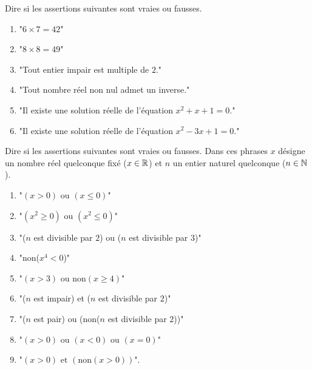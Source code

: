 \documentclass[11pt,class=report,crop=false]{standalone}
\begin{document}


\bigskip
\bigskip


\exercice{}
\enonce
Dire si les assertions suivantes sont vraies ou fausses.
 \begin{enumerate}
      \item "$6\times 7 = 42$"
      \item "$8 \times 8 = 49$"
      \item "Tout entier impair est multiple de $2$."
      \item "Tout nombre réel non nul admet un inverse."
      \item "Il existe une solution réelle de l'équation $x^2+x+1=0$."
      \item "Il existe une solution réelle de l'équation $x^2-3x+1=0$." 
\end{enumerate} 
\finenonce

\finexercice




\exercice{}
\enonce
Dire si les assertions suivantes sont vraies ou fausses.
Dans ces phrases $x$ désigne un nombre réel quelconque fixé  ($x \in \mathbb{R}$) et $n$ un entier naturel quelconque ($n \in \mathbb{N}$).

\begin{enumerate}
    \item "$(x > 0) \text{ ou } (x \le 0)$"    
    \item "$(x^2 \ge 0) \text{ ou } (x^2 \le 0)$"
    \item "($n$ est divisible par $2$) ou ($n$ est divisible par $3$)"
    \item "non($x^4 < 0$)"
    \item "$(x > 3) \text{ ou } \text{non}(x \ge 4)$"  
    \item "($n$ est impair) et ($n$ est divisible par $2$)"
    \item "($n$ est pair) ou (non($n$ est divisible par $2$))"
    \item "$(x>0)  \text{ ou } (x<0)  \text{ ou } (x=0)$"
    \item "$(x>0)  \text{ et } (\text{non}(x>0))$".
\end{enumerate}
 
\finenonce

\finexercice
\end{document}
